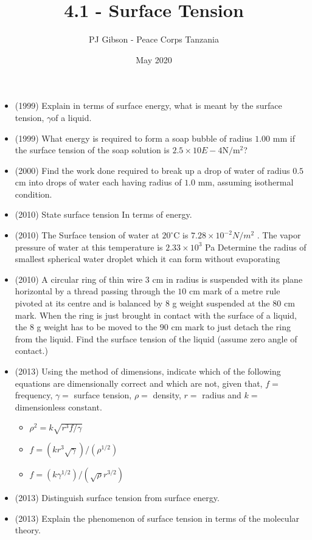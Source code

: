 \documentclass{article}
\title{\textbf{4.1 - Surface Tension}}
\author{PJ Gibson - Peace Corps Tanzania}
\date{May 2020}
\begin{document}
\maketitle

\begin{itemize}
\item (1999)  Explain in terms of surface energy, what is meant by the surface tension, ​ $ \gamma $ ​ of a liquid. 
\item (1999)  What energy is required to form a soap bubble of radius $ 1.00$ mm if the surface tension of the soap solution is $ 2.5 \times 10$ ​$ E-4$ ​ N$/$m$ ^{2}$ ​ ?
\item (2000)  Find the work done required to break up a drop of water of radius $ 0.5$ cm into drops of water each having radius of $ 1.0$ mm, assuming isothermal condition.
\item (2010)  State surface tension In terms of energy. 
\item (2010)  The Surface tension of water at $ 20^{\circ}$C is $ 7.28 \times 10^{-2}N/m^{2}$ . The vapor pressure of water at this temperature is $ 2.33 \times 10^{3}$ Pa Determine the radius of smallest spherical water droplet which it can form without evaporating
\item (2010)  A circular ring of thin wire $ 3$ cm in radius is suspended with its plane horizontal by a thread passing through the $ 10$ cm mark of a metre rule pivoted at its centre and is balanced by $ 8$ g weight suspended at the $ 80$ cm mark. When the ring is just brought in contact with the surface of a liquid, the $ 8$ g weight has to be moved to the $ 90$ cm mark to just detach the ring from the liquid. Find the surface tension of the liquid (assume zero angle of contact.)
\item (2013)  Using the method of dimensions, indicate which of the following equations are dimensionally correct and which are not, given that, $ f=$ frequency, $ \gamma =$ surface tension, $ \rho =$ density, $ r=$ radius and $ k=$ dimensionless constant.
 \begin{itemize}
\item  $ \rho^{2}=k\sqrt{r^{3}f/\gamma }$
\item  $ f=(kr^{3}\sqrt{\gamma })/(\rho^{1/2})$
\item  $ f=(k\gamma^{1/2})/(\sqrt{\rho}r^{3/2})$
\end{itemize}
\item (2013)  Distinguish surface tension from surface energy.
\item (2013)  Explain the phenomenon of surface tension in terms of the molecular theory.

\end{itemize}
\end{document}
